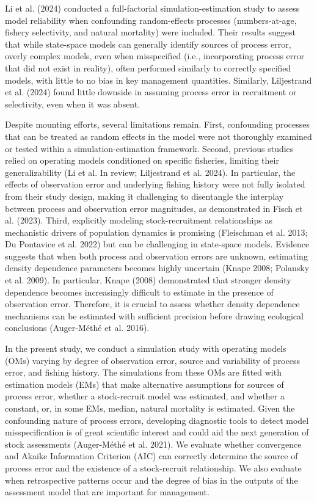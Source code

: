 \documentclass[
  12pt,
]{article}
\begin{document}
Li et al. (2024) conducted a full-factorial simulation-estimation study
to assess model reliability when confounding random-effects processes
(numbers-at-age, fishery selectivity, and natural mortality) were
included. Their results suggest that while state-space models can
generally identify sources of process error, overly complex models, even
when misspecified (i.e., incorporating process error that did not exist
in reality), often performed similarly to correctly specified models,
with little to no bias in key management quantities. Similarly,
Liljestrand et al. (2024) found little downside in assuming process
error in recruitment or selectivity, even when it was absent.

Despite mounting efforts, several limitations remain. First, confounding
processes that can be treated as random effects in the model were not
thoroughly examined or tested within a simulation-estimation framework.
Second, previous studies relied on operating models conditioned on
specific fisheries, limiting their generalizability (Li et al. In
review; Liljestrand et al. 2024). In particular, the effects of
observation error and underlying fishing history were not fully isolated
from their study design, making it challenging to disentangle the
interplay between process and observation error magnitudes, as
demonstrated in Fisch et al. (2023). Third, explicitly modeling
stock-recruitment relationships as mechanistic drivers of population
dynamics is promising (Fleischman et al. 2013; Du Pontavice et al. 2022)
but can be challenging in state-space models. Evidence suggests that
when both process and observation errors are unknown, estimating density
dependence parameters becomes highly uncertain (Knape 2008; Polansky et
al. 2009). In particular, Knape (2008) demonstrated that stronger
density dependence becomes increasingly difficult to estimate in the
presence of observation error. Therefore, it is crucial to assess
whether density dependence mechanisms can be estimated with sufficient
precision before drawing ecological conclusions (Auger-Méthé et al.
2016).

In the present study, we conduct a simulation study with operating
models (OMs) varying by degree of observation error, source and
variability of process error, and fishing history. The simulations from
these OMs are fitted with estimation models (EMs) that make alternative
assumptions for sources of process error, whether a stock-recruit model
was estimated, and whether a constant, or, in some EMs, median, natural
mortality is estimated. Given the confounding nature of process errors,
developing diagnostic tools to detect model misspecification is of great
scientific interest and could aid the next generation of stock
assessments (Auger-Méthé et al. 2021). We evaluate whether convergence
and Akaike Information Criterion (AIC) can correctly determine the
source of process error and the existence of a stock-recruit
relationship. We also evaluate when retrospective patterns occur and the
degree of bias in the outputs of the assessment model that are important
for management.
\end{document}
